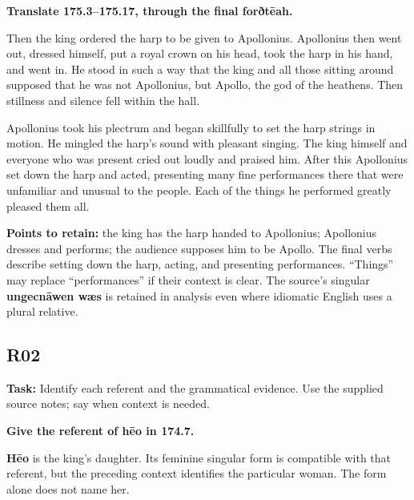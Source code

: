 \textbf{Translate 175.3–175.17, through the final forðtēah.}

Then the king ordered the harp to be given to Apollonius. Apollonius then went out, dressed himself, put a royal crown on his head, took the harp in his hand, and went in. He stood in such a way that the king and all those sitting around supposed that he was not Apollonius, but Apollo, the god of the heathens. Then stillness and silence fell within the hall.

Apollonius took his plectrum and began skillfully to set the harp strings in motion. He mingled the harp's sound with pleasant singing. The king himself and everyone who was present cried out loudly and praised him. After this Apollonius set down the harp and acted, presenting many fine performances there that were unfamiliar and unusual to the people. Each of the things he performed greatly pleased them all.

\textbf{Points to retain:} the king has the harp handed to Apollonius; Apollonius dresses and performs; the audience supposes him to be Apollo. The final verbs describe setting down the harp, acting, and presenting performances. “Things” may replace “performances” if their context is clear. The source's singular \textbf{ungecnāwen wæs} is retained in analysis even where idiomatic English uses a plural relative.

\subsection*{R02}

\textbf{Task:} Identify each referent and the grammatical evidence. Use the supplied source notes; say when context is needed.

\textbf{Give the referent of hēo in 174.7.}

\textbf{Hēo} is the king's daughter. Its feminine singular form is compatible with that referent, but the preceding context identifies the particular woman. The form alone does not name her.

